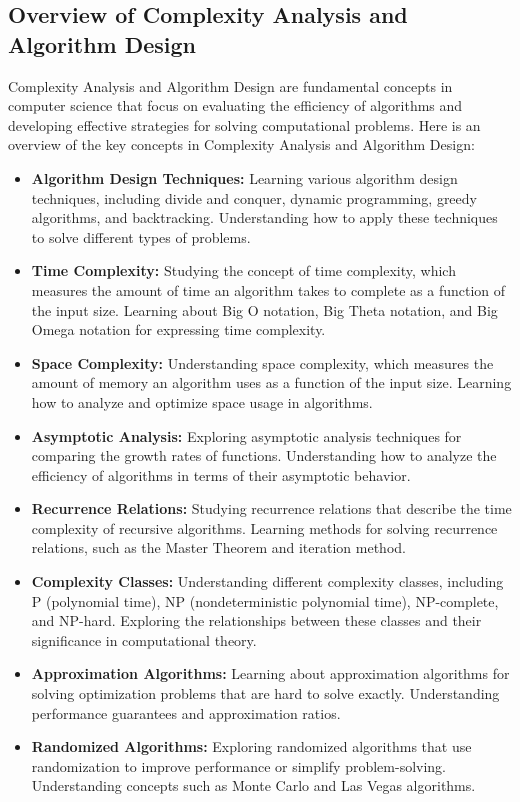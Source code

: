 \documentclass[openany]{book}
\begin{document}
\subsection{Overview of Complexity Analysis and Algorithm Design}
Complexity Analysis and Algorithm Design are fundamental concepts in computer science that focus on evaluating the efficiency of algorithms and developing effective strategies for solving computational problems. Here is an overview of the key concepts in Complexity Analysis and Algorithm Design:
\begin{itemize}
    \item \textbf{Algorithm Design Techniques:} Learning various algorithm design techniques, including divide and conquer, dynamic programming, greedy algorithms, and backtracking. Understanding how to apply these techniques to solve different types of problems.
    \item \textbf{Time Complexity:} Studying the concept of time complexity, which measures the amount of time an algorithm takes to complete as a function of the input size. Learning about Big O notation, Big Theta notation, and Big Omega notation for expressing time complexity.
    \item \textbf{Space Complexity:} Understanding space complexity, which measures the amount of memory an algorithm uses as a function of the input size. Learning how to analyze and optimize space usage in algorithms.
    \item \textbf{Asymptotic Analysis:} Exploring asymptotic analysis techniques for comparing the growth rates of functions. Understanding how to analyze the efficiency of algorithms in terms of their asymptotic behavior.
    \item \textbf{Recurrence Relations:} Studying recurrence relations that describe the time complexity of recursive algorithms. Learning methods for solving recurrence relations, such as the Master Theorem and iteration method.
    \item \textbf{Complexity Classes:} Understanding different complexity classes, including P (polynomial time), NP (nondeterministic polynomial time), NP-complete, and NP-hard. Exploring the relationships between these classes and their significance in computational theory.
    \item \textbf{Approximation Algorithms:} Learning about approximation algorithms for solving optimization problems that are hard to solve exactly. Understanding performance guarantees and approximation ratios.
    \item \textbf{Randomized Algorithms:} Exploring randomized algorithms that use randomization to improve performance or simplify problem-solving. Understanding concepts such as Monte Carlo and Las Vegas algorithms.

\end{itemize}
\end{document}
